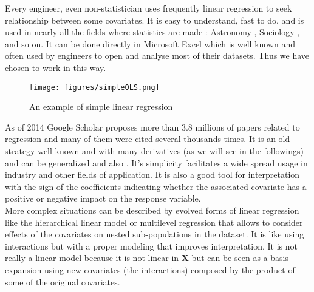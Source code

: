\documentclass[12pt,a4paper]{report}
\begin{document}
		Every engineer, even non-statistician uses frequently linear regression to seek relationship between some covariates. It is easy to understand, fast to do, and is used in nearly all the fields where statistics are made \cite{montgomery2012introduction} : Astronomy \cite{isobe1990linear}, Sociology \cite{longford2012revision}, and so on. It can be done directly in Microsoft Excel which is well known and often used by engineers to open and analyse most of their datasets. Thus we have chosen to work in this way.\\
		 
\begin{figure}
\centering
	\texttt{[image: figures/simpleOLS.png]} 
	\caption{An example of simple linear regression}
\end{figure}		 
		 
		 As of 2014 Google Scholar proposes more than $3.8$ millions of papers related to regression and many of them were cited several thousands times. It is an old strategy well known and with many derivatives (as we will see in the followings) and can be generalized 		 \cite{kiebel2003general,wickens2004general,nelder1972generalized} and also \cite{mccullagh1989generalized}. 
	It's simplicity facilitates a wide spread usage in industry and other fields of application. It is also a good tool for interpretation with the sign of the coefficients indicating whether the associated covariate has a positive or negative impact on the response variable. \\
	
	More complex situations can be described by evolved forms of linear regression like the hierarchical linear model \cite{raudenbush2002hierarchical,woltman2012introduction}  or  multilevel regression \cite{moerbeek2003comparison,maas2004robustness,hox1998multilevel} that allows to consider effects of the covariates on nested sub-populations in the dataset. It is like using interactions but with a proper modeling that improves interpretation. It is not really a linear model because it is not linear in $\boldsymbol{X}$ but can be seen as a basis expansion using new covariates (the interactions) composed by the product of some of the original covariates.
%			
%
\end{document}
